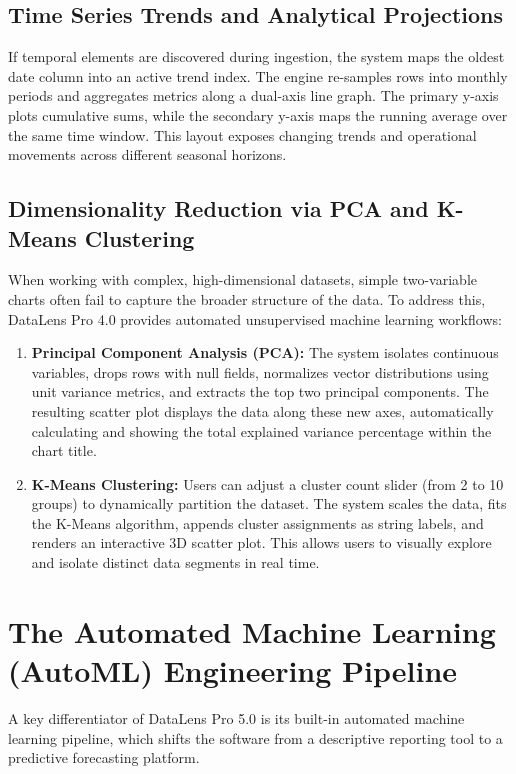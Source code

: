 \documentclass[11pt,a4paper,titlepage]{article}
\begin{document}
\subsection{Time Series Trends and Analytical Projections}
If temporal elements are discovered during ingestion, the system maps the oldest date column into an active trend index. The engine re-samples rows into monthly periods and aggregates metrics along a dual-axis line graph. The primary y-axis plots cumulative sums, while the secondary y-axis maps the running average over the same time window. This layout exposes changing trends and operational movements across different seasonal horizons.

\subsection{Dimensionality Reduction via PCA and K-Means Clustering}
When working with complex, high-dimensional datasets, simple two-variable charts often fail to capture the broader structure of the data. To address this, DataLens Pro 4.0 provides automated unsupervised machine learning workflows:
\begin{enumerate}
    \item \textbf{Principal Component Analysis (PCA):} The system isolates continuous variables, drops rows with null fields, normalizes vector distributions using unit variance metrics, and extracts the top two principal components. The resulting scatter plot displays the data along these new axes, automatically calculating and showing the total explained variance percentage within the chart title.
    \item \textbf{K-Means Clustering:} Users can adjust a cluster count slider (from 2 to 10 groups) to dynamically partition the dataset. The system scales the data, fits the K-Means algorithm, appends cluster assignments as string labels, and renders an interactive 3D scatter plot. This allows users to visually explore and isolate distinct data segments in real time.
\end{enumerate}


\section{The Automated Machine Learning (AutoML) Engineering Pipeline}
A key differentiator of DataLens Pro 5.0 is its built-in automated machine learning pipeline, which shifts the software from a descriptive reporting tool to a predictive forecasting platform.
\end{document}
